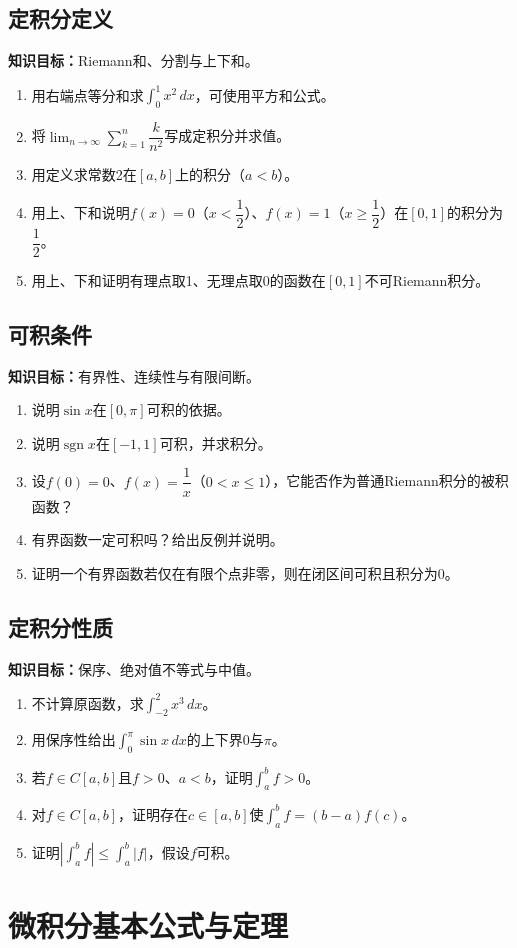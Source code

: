 \documentclass[11pt,a4paper,fontset=fandol]{ctexrep}
\newcommand{\goal}[1]{\textbf{知识目标：}#1\par}
\begin{document}
\subsection{定积分定义}
\goal{Riemann和、分割与上下和。}
\begin{enumerate}
\item 用右端点等分和求$\int_0^1x^2\,dx$，可使用平方和公式。
\item 将$\lim_{n\to\infty}\sum_{k=1}^n\dfrac{k}{n^2}$写成定积分并求值。
\item 用定义求常数2在$[a,b]$上的积分（$a<b$）。
\item 用上、下和说明$f(x)=0$（$x<\dfrac{1}{2}$）、$f(x)=1$（$x\ge\dfrac{1}{2}$）在$[0,1]$的积分为$\dfrac{1}{2}$。
\item 用上、下和证明有理点取1、无理点取0的函数在$[0,1]$不可Riemann积分。
\end{enumerate}
\subsection{可积条件}
\goal{有界性、连续性与有限间断。}
\begin{enumerate}
\item 说明$\sin x$在$[0,\pi]$可积的依据。
\item 说明$\operatorname{sgn}x$在$[-1,1]$可积，并求积分。
\item 设$f(0)=0$、$f(x)=\dfrac{1}{x}$（$0<x\le1$），它能否作为普通Riemann积分的被积函数？
\item 有界函数一定可积吗？给出反例并说明。
\item 证明一个有界函数若仅在有限个点非零，则在闭区间可积且积分为0。
\end{enumerate}
\subsection{定积分性质}
\goal{保序、绝对值不等式与中值。}
\begin{enumerate}
\item 不计算原函数，求$\int_{-2}^2x^3\,dx$。
\item 用保序性给出$\int_0^\pi\sin x\,dx$的上下界$0$与$\pi$。
\item 若$f\in C[a,b]$且$f>0$、$a<b$，证明$\int_a^bf>0$。
\item 对$f\in C[a,b]$，证明存在$c\in[a,b]$使$\int_a^bf=(b-a)f(c)$。
\item 证明$|\int_a^bf|\le\int_a^b|f|$，假设$f$可积。
\end{enumerate}
\section{微积分基本公式与定理}
\end{document}
